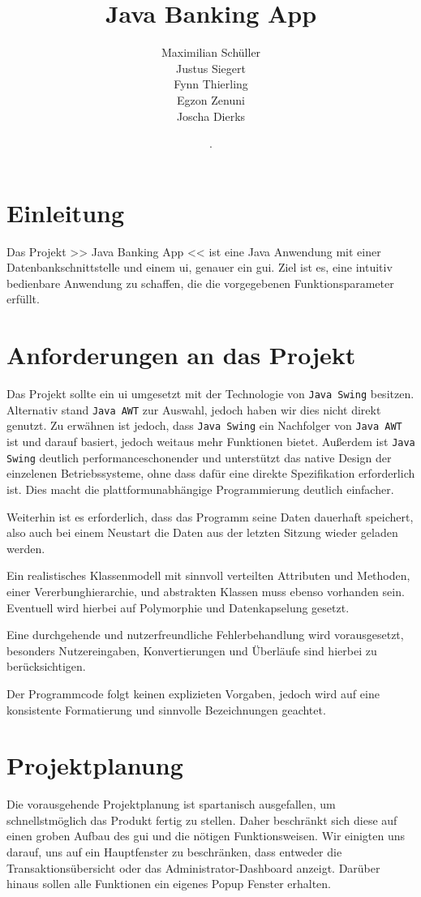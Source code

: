 \documentclass[
	12pt,
	a4paper,
	hidelinks
	]{report}
\title{Java Banking App}
\author{Maximilian Schüller \\ Justus Siegert \\ Fynn Thierling \\ Egzon Zenuni \\ Joscha Dierks }
\date{\the\day. \monthword{\month} \the\year}
\newcommand{\code}[1]{\texttt{#1}}
\begin{document}
\maketitle
\tableofcontents
\newpage

\section{Einleitung}
Das Projekt >> Java Banking App << ist eine Java Anwendung mit einer Datenbankschnittstelle und einem \ac{ui}, genauer ein \ac{gui}. Ziel ist es, eine intuitiv bedienbare Anwendung zu schaffen, die die vorgegebenen Funktionsparameter erfüllt.

\section{Anforderungen an das Projekt}
Das Projekt sollte ein \ac{ui} umgesetzt mit der Technologie von \code{Java Swing} besitzen. Alternativ stand \code{Java AWT} zur Auswahl, jedoch haben wir dies nicht direkt genutzt. Zu erwähnen ist jedoch, dass \code{Java Swing} ein Nachfolger von \code{Java AWT} ist und darauf basiert, jedoch weitaus mehr Funktionen bietet. Außerdem ist \code{Java Swing} deutlich performanceschonender und unterstützt das native Design der einzelenen Betriebssysteme, ohne dass dafür eine direkte Spezifikation erforderlich ist. Dies macht die plattformunabhängige Programmierung deutlich einfacher.

Weiterhin ist es erforderlich, dass das Programm seine Daten dauerhaft speichert, also auch bei einem Neustart die Daten aus der letzten Sitzung wieder geladen werden.

Ein realistisches Klassenmodell mit sinnvoll verteilten Attributen und Methoden, einer Vererbunghierarchie, und abstrakten Klassen muss ebenso vorhanden sein. Eventuell wird hierbei auf Polymorphie und Datenkapselung gesetzt.

Eine durchgehende und nutzerfreundliche Fehlerbehandlung wird vorausgesetzt, besonders Nutzereingaben, Konvertierungen und Überläufe sind hierbei zu berücksichtigen.

Der Programmcode folgt keinen explizieten Vorgaben, jedoch wird auf eine konsistente Formatierung und sinnvolle Bezeichnungen geachtet.

\newpage

\section{Projektplanung}
Die vorausgehende Projektplanung ist spartanisch ausgefallen, um schnellstmöglich das Produkt fertig zu stellen. Daher beschränkt sich diese auf einen groben Aufbau des \ac{gui} und die nötigen Funktionsweisen. Wir einigten uns darauf, uns auf ein Hauptfenster zu beschränken, dass entweder die Transaktionsübersicht oder das Administrator-Dashboard anzeigt. Darüber hinaus sollen alle Funktionen ein eigenes Popup Fenster erhalten.
\end{document}
